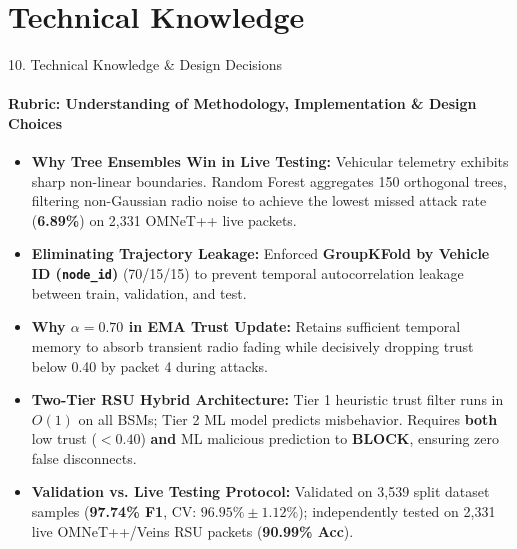 \section{Technical Knowledge}
\begin{frame}{10. Technical Knowledge \& Design Decisions}
    \framesubtitle{Rubric: Understanding of Methodology, Implementation \& Design Choices}
    \small
    \begin{itemize}
        \item \textbf{Why Tree Ensembles Win in Live Testing:} Vehicular telemetry exhibits sharp non-linear boundaries. Random Forest aggregates 150 orthogonal trees, filtering non-Gaussian radio noise to achieve the lowest missed attack rate (\textbf{6.89\%}) on 2{,}331 OMNeT++ live packets.
        \item \textbf{Eliminating Trajectory Leakage:} Enforced \textbf{GroupKFold by Vehicle ID (\texttt{node\_id})} (70/15/15) to prevent temporal autocorrelation leakage between train, validation, and test.
        \item \textbf{Why $\alpha = 0.70$ in EMA Trust Update:} Retains sufficient temporal memory to absorb transient radio fading while decisively dropping trust below 0.40 by packet 4 during attacks.
        \item \textbf{Two-Tier RSU Hybrid Architecture:} Tier 1 heuristic trust filter runs in $O(1)$ on all BSMs; Tier 2 ML model predicts misbehavior. Requires \textbf{both} low trust ($< 0.40$) \textbf{and} ML malicious prediction to \textbf{BLOCK}, ensuring zero false disconnects.
        \item \textbf{Validation vs. Live Testing Protocol:} Validated on 3{,}539 split dataset samples (\textbf{97.74\% F1}, CV: $96.95\% \pm 1.12\%$); independently tested on 2{,}331 live OMNeT++/Veins RSU packets (\textbf{90.99\% Acc}).
    \end{itemize}
\end{frame}
